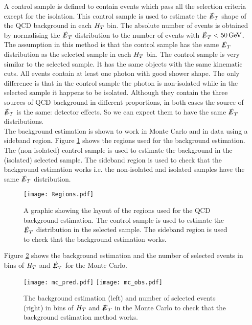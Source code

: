 A control sample is defined to contain events which pass all the selection 
criteria except for the isolation. This control sample is used to estimate the
$\slashed{E}_{T}$ shape of the QCD background in each $H_{T}$ bin. The absolute number of
events is obtained by normalising the $\slashed{E}_{T}$ distribution to the number of
events with $\slashed{E}_{T} < 50 \, \mathrm{GeV}$. \\

The assumption in this method is that the control sample has the same $\slashed{E}_{T}$
distribution as the selected sample in each $H_{T}$ bin. The control sample is
very similar to the selected sample. It has the same objects with the same
kinematic cuts. All events contain at least one photon with good shower shape.
The only difference is that in the control sample the photon is non-isolated
while in the selected sample it happens to be isolated. Although they contain
the three sources of QCD background in different proportions, in both cases the 
source of $\slashed{E}_{T}$ is the same: detector effects. So we can expect them to have 
the same $\slashed{E}_{T}$ distributions. \\

The background estimation is shown to work in Monte Carlo and in data using a 
sideband region. Figure \ref{fig:Regions} shows the regions used for the
background estimation. The (non-isolated) control sample is used to estimate the 
background in the (isolated) selected sample. The sideband region is used to
check that the background estimation works i.e. the non-isolated and isolated 
samples have the same $\slashed{E}_{T}$ distribution. \\

\begin{figure}
\begin{center}
\texttt{[image: Regions.pdf]}
\end{center}
\caption{A graphic showing the layout of the regions used for the QCD background
estimation. The control sample is used to estimate the $\slashed{E}_{T}$ distribution in
the selected sample. The sideband region is used to check that the background
estimation works.}
\label{fig:Regions}
\end{figure}

Figure \ref{fig:Bkgd_Est_MC} shows the background estimation and the number of
selected events in bins of $H_{T}$ and $\slashed{E}_{T}$ for the Monte Carlo. \\

\begin{figure}
\texttt{[image: mc\_pred.pdf]}
\texttt{[image: mc\_obs.pdf]}
\caption{The background estimation (left) and number of selected events (right) 
in bins of $H_{T}$ and $\slashed{E}_{T}$ in the Monte Carlo to check that the background
estimation method works.}
\label{fig:Bkgd_Est_MC}
\end{figure}

